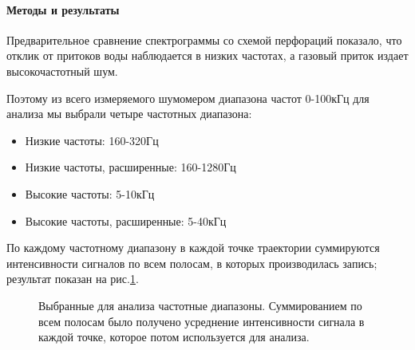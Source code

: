 \paragraph{Методы и результаты}
\par
Предварительное сравнение спектрограммы со схемой перфораций показало, что отклик от притоков воды наблюдается в низких частотах, а газовый приток издает высокочастотный шум.
\par
Поэтому из всего измеряемого шумомером диапазона частот 0-100кГц для анализа мы выбрали четыре частотных диапазона:
\begin{itemize}
    \item Низкие частоты: 160-320Гц
    \item Низкие частоты, расширенные: 160-1280Гц
    \item Высокие частоты: 5-10кГц
    \item Высокие частоты, расширенные: 5-40кГц
\end{itemize}
\par
По каждому частотному диапазону в каждой точке траектории суммируются интенсивности сигналов по всем полосам, в которых производилась запись; результат показан на рис.\ref{fig:hfnd_bands}.

\begin{figure}[H]
\centering
    \vfil\vskip -20pt
    \vfil\vskip -20pt
    \vfil\vskip -20pt
    \vfil\vskip -20pt
\caption{Выбранные для анализа частотные диапазоны. Суммированием по всем полосам было получено усреднение интенсивности сигнала в каждой точке, которое потом используется для анализа.}
\label{fig:hfnd_bands}
\end{figure}


